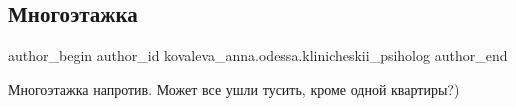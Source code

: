  
 
 
 
 

\subsection{Многоэтажка}
\label{sec:02_12_2022.fb.kovaleva_anna.odessa.klinicheskii_psiholog.1.mnogoetazhka}

\ifcmt
 author_begin
   author_id kovaleva_anna.odessa.klinicheskii_psiholog
 author_end
\fi

Многоэтажка напротив. Может все ушли тусить, кроме одной квартиры?)
